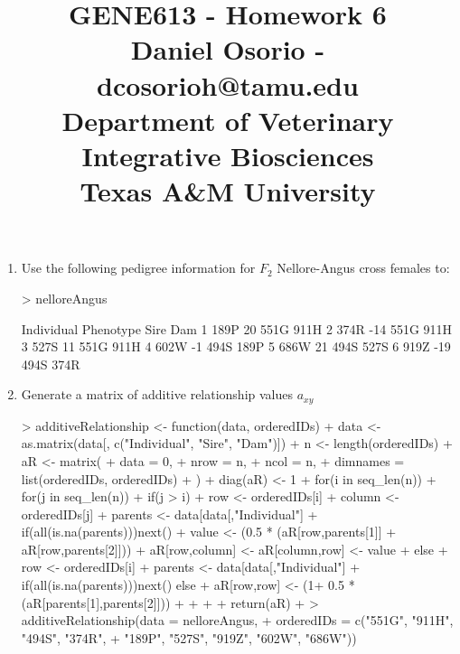 \documentclass[12pt,a4paper]{paper}
\begin{document}
\title{GENE613 - Homework 6\\\small{Daniel Osorio - dcosorioh@tamu.edu\\Department of Veterinary Integrative Biosciences\\Texas A\&M University}}
\maketitle

\begin{enumerate}
\item[] Use the following pedigree information for $F_{2}$ Nellore-Angus cross females to:
\begin{Schunk}
\begin{Sinput}
> nelloreAngus
\end{Sinput}
\begin{Soutput}
  Individual Phenotype Sire  Dam
1       189P        20 551G 911H
2       374R       -14 551G 911H
3       527S        11 551G 911H
4       602W        -1 494S 189P
5       686W        21 494S 527S
6       919Z       -19 494S 374R
\end{Soutput}
\end{Schunk}
\item Generate a matrix of additive relationship values $a_{xy}$
\begin{Schunk}
\begin{Sinput}
> additiveRelationship <- function(data, orderedIDs){
+   data <- as.matrix(data[, c("Individual", "Sire", "Dam")])
+   n <- length(orderedIDs)
+   aR <- matrix(
+     data = 0,
+     nrow = n,
+     ncol = n,
+     dimnames = list(orderedIDs, orderedIDs)
+   )
+   diag(aR) <- 1
+   for(i in seq_len(n)){
+     for(j in seq_len(n)){
+       if(j > i){
+         row <- orderedIDs[i]
+         column <- orderedIDs[j]
+         parents <- data[data[,"Individual"] %in% column,2:3]
+         if(all(is.na(parents))){next()}
+         value <- (0.5 * (aR[row,parents[1]] + aR[row,parents[2]]))
+         aR[row,column] <- aR[column,row] <-  value
+       } else {
+       row <- orderedIDs[i]
+       parents <- data[data[,"Individual"] %in% row,2:3]
+       if(all(is.na(parents))){next()} else {
+       aR[row,row] <- (1+ 0.5 * (aR[parents[1],parents[2]]))}
+       }
+     }
+   }
+   return(aR)
+ }
> additiveRelationship(data = nelloreAngus,
+                      orderedIDs = c("551G", "911H", "494S", "374R",
+                              "189P", "527S", "919Z", "602W", "686W"))
\end{Sinput}
\begin{Soutput}

\end{Soutput}
\end{Schunk}
\end{enumerate}
\end{document}

